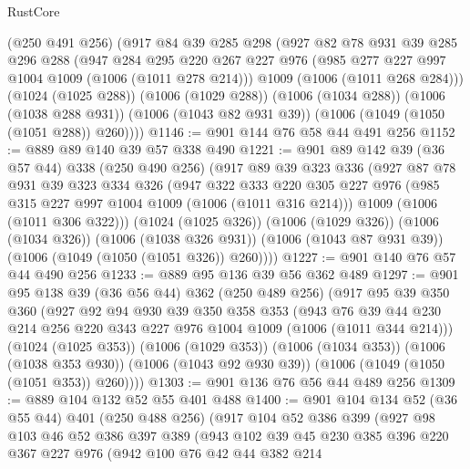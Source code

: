 \begin{lexlean}{RustCore}
\begin{coremodule}
    (@250 @491 @256)
    (@917
      @84
      @39
      @285
      @298
      (@927
        @82
        @78
        @931
        @39
        @285
        @296
        @288
        (@947
          @284
          @295
          @220
          @267
          @227
          @976
          (@985 @277 @227 @997 @1004 @1009 (@1006 (@1011 @278 @214)))
          @1009
          (@1006 (@1011 @268 @284)))
        (@1024 (@1025 @288))
        (@1006 (@1029 @288))
        (@1006 (@1034 @288))
        (@1006 (@1038 @288 @931))
        (@1006 (@1043 @82 @931 @39))
        (@1006 (@1049 (@1050 (@1051 @288)) @260))))
@1146 := @901 @144 @76 @58 @44 @491 @256
@1152 := @889 @89 @140 @39 @57 @338 @490
@1221 := @901
    @89
    @142
    @39
    (@36 @57 @44)
    @338
    (@250 @490 @256)
    (@917
      @89
      @39
      @323
      @336
      (@927
        @87
        @78
        @931
        @39
        @323
        @334
        @326
        (@947
          @322
          @333
          @220
          @305
          @227
          @976
          (@985 @315 @227 @997 @1004 @1009 (@1006 (@1011 @316 @214)))
          @1009
          (@1006 (@1011 @306 @322)))
        (@1024 (@1025 @326))
        (@1006 (@1029 @326))
        (@1006 (@1034 @326))
        (@1006 (@1038 @326 @931))
        (@1006 (@1043 @87 @931 @39))
        (@1006 (@1049 (@1050 (@1051 @326)) @260))))
@1227 := @901 @140 @76 @57 @44 @490 @256
@1233 := @889 @95 @136 @39 @56 @362 @489
@1297 := @901
    @95
    @138
    @39
    (@36 @56 @44)
    @362
    (@250 @489 @256)
    (@917
      @95
      @39
      @350
      @360
      (@927
        @92
        @94
        @930
        @39
        @350
        @358
        @353
        (@943 @76 @39 @44 @230 @214 @256 @220 @343 @227 @976 @1004 @1009 (@1006 (@1011 @344 @214)))
        (@1024 (@1025 @353))
        (@1006 (@1029 @353))
        (@1006 (@1034 @353))
        (@1006 (@1038 @353 @930))
        (@1006 (@1043 @92 @930 @39))
        (@1006 (@1049 (@1050 (@1051 @353)) @260))))
@1303 := @901 @136 @76 @56 @44 @489 @256
@1309 := @889 @104 @132 @52 @55 @401 @488
@1400 := @901
    @104
    @134
    @52
    (@36 @55 @44)
    @401
    (@250 @488 @256)
    (@917
      @104
      @52
      @386
      @399
      (@927
        @98
        @103
        @46
        @52
        @386
        @397
        @389
        (@943
          @102
          @39
          @45
          @230
          @385
          @396
          @220
          @367
          @227
          @976
          (@942
            @100
            @76
            @42
            @44
            @382
            @214

\end{coremodule}
\end{lexlean}
